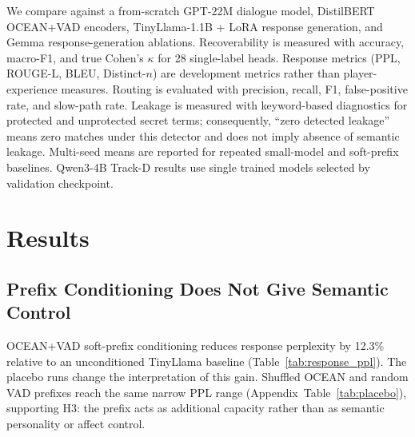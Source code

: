 \documentclass[11pt]{article}
\begin{document}
We compare against a from-scratch GPT-22M dialogue model, DistilBERT OCEAN+VAD encoders, TinyLlama-1.1B + LoRA response generation, and Gemma response-generation ablations. Recoverability is measured with accuracy, macro-F1, and true Cohen's $\kappa$ for 28 single-label heads. Response metrics (PPL, ROUGE-L, BLEU, Distinct-$n$) are development metrics rather than player-experience measures. Routing is evaluated with precision, recall, F1, false-positive rate, and slow-path rate. Leakage is measured with keyword-based diagnostics for protected and unprotected secret terms; consequently, ``zero detected leakage'' means zero matches under this detector and does not imply absence of semantic leakage. Multi-seed means are reported for repeated small-model and soft-prefix baselines. Qwen3-4B Track-D results use single trained models selected by validation checkpoint.

\section{Results}
\label{sec:results}

\subsection{Prefix Conditioning Does Not Give Semantic Control}

OCEAN+VAD soft-prefix conditioning reduces response perplexity by 12.3\% relative to an unconditioned TinyLlama baseline (Table~\ref{tab:response_ppl}). The placebo runs change the interpretation of this gain. Shuffled OCEAN and random VAD prefixes reach the same narrow PPL range (Appendix~Table~\ref{tab:placebo}), supporting H3: the prefix acts as additional capacity rather than as semantic personality or affect control.

\begin{table}[t]
\centering
\caption{Response-generation comparison. PPL values are within-experiment diagnostics and are not tokenizer-normalized across model families.}
\label{tab:response_ppl}
\small
{}
\end{table}
\end{document}
